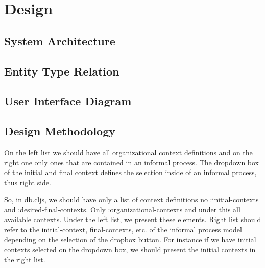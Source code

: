 \chapter{Design}
\label{chap:design}


\section{System Architecture}
\label{sec:sysarch}


\section{Entity Type Relation}
\label{sec:enttyperelation}


\section{User Interface Diagram}
\label{sec:uidiagram}

\section{Design Methodology}
\label{sec:designmethodology}

On the left list we should have all organizational context definitions and on the right one only ones that are contained in an informal process. The dropdown box of the initial and final context defines the selection inside of an informal process, thus right side.

So, in db.cljs, we should have only a list of context definitions no :initial-contexts and :desired-final-contexts. Only :organizational-contexts and under this all available contexts. Under the left list, we present these elements. Right list should refer to the initial-context, final-contexts, etc. of the informal process model depending on the selection of the dropbox button. For instance if we have initial contexts selected on the dropdown box, we should present the initial contexts in the right list.

